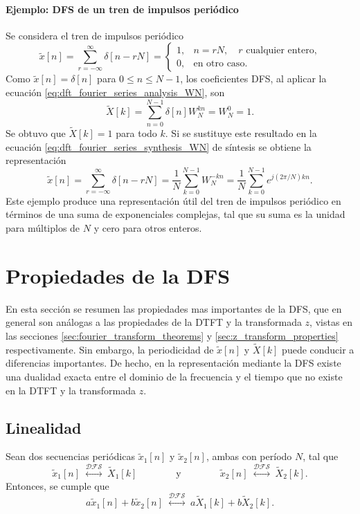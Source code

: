 \documentclass[a4paper]{report}
\begin{document}
\paragraph{Ejemplo: DFS de un tren de impulsos periódico} Se considera el tren de impulsos periódico
\[
 \tilde{x}[n]=\sum_{r=-\infty}^\infty\delta[n-rN]=
 \left\{ 
  \begin{array}{ll}
   1, & n=rN,\quad r\textrm{ cualquier entero,}\\
   0, & \textrm{en otro caso.}
  \end{array}
 \right.
\]
Como \(\tilde{x}[n]=\delta[n]\) para \(0\leq n\leq N-1\), los coeficientes DFS, al aplicar la ecuación \ref{eq:dft_fourier_series_analysis_WN}, son
\[
 \tilde{X}[k]=\sum_{n=0}^{N-1}\delta[n]W_N^{kn}=W_N^{0}=1.
\]
Se obtuvo que \(\tilde{X}[k]=1\) para todo \(k\). Si se sustituye este resultado en la ecuación \ref{eq:dft_fourier_series_synthesis_WN} de síntesis se obtiene la representación
\begin{equation}\label{eq:dft_fourier_series_impulse_train}
 \tilde{x}[n]=\sum_{r=-\infty}^\infty\delta[n-rN]=\frac{1}{N}\sum_{k=0}^{N-1}W_N^{-kn}
  =\frac{1}{N}\sum_{k=0}^{N-1}e^{j(2\pi/N)kn}. 
\end{equation}
Este ejemplo produce una representación útil del tren de impulsos periódico en términos de una suma de exponenciales complejas, tal que su suma es la unidad para múltiplos de \(N\) y cero para otros enteros.

\section{Propiedades de la DFS}\label{sec:dft_dfs_properties}

En esta sección se resumen las propiedades mas importantes de la DFS, que en general son análogas a las propiedades de la DTFT y la transformada \(z\), vistas en las secciones \ref{sec:fourier_transform_theorems} y \ref{sec:z_transform_properties} respectivamente. Sin embargo, la periodicidad de \(\tilde{x}[n]\) y \(\tilde{X}[k]\) puede conducir a diferencias importantes. De hecho, en la representación mediante la DFS existe una dualidad exacta entre el dominio de la frecuencia y el tiempo que no existe en la DTFT y la transformada \(z\).

\subsection{Linealidad}

Sean dos secuencias periódicas \(\tilde{x}_1[n]\) y \(\tilde{x}_2[n]\), ambas con período \(N\), tal que 
\[
 \tilde{x}_1[n]\;\overset{\mathcal{DFS}}{\longleftrightarrow}\;\tilde{X}_1[k]
 \qquad\qquad\textrm{y}\qquad\qquad
 \tilde{x}_2[n]\;\overset{\mathcal{DFS}}{\longleftrightarrow}\;\tilde{X}_2[k].
\]
Entonces, se cumple que 
\[
 a\tilde{x}_1[n]+b\tilde{x}_2[n]\;\overset{\mathcal{DFS}}{\longleftrightarrow}\;a\tilde{X}_1[k]+b\tilde{X}_2[k].
\]
\end{document}
